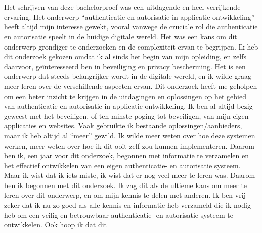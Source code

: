 
\chapter*{}%
\label{ch:voorwoord}


Het schrijven van deze bachelorproef was een uitdagende en heel verrijkende ervaring. Het onderwerp ``authenticatie en autorisatie in applicatie ontwikkeling'' heeft altijd mijn interesse gewekt, 
vooral vanwege de cruciale rol die authenticatie en autorisatie speelt in de huidige digitale wereld. Het was een kans om dit onderwerp grondiger te onderzoeken en de complexiteit ervan te begrijpen.
Ik heb dit onderzoek gekozen omdat ik al sinds het begin van mijn opleiding, en zelfs daarvoor, geïnteresseerd ben in beveiliging en privacy bescherming. Het is een onderwerp dat steeds belangrijker wordt 
in de digitale wereld, en ik wilde graag meer leren over de verschillende aspecten ervan. Dit onderzoek heeft me geholpen om een beter inzicht te krijgen in de uitdagingen en oplossingen op het gebied van
authenticatie en autorisatie in applicatie ontwikkeling.
\newline
Ik ben al altijd bezig geweest met het beveiligen, of ten minste poging tot beveiligen, van mijn eigen applicaties en websites. Vaak gebruikte ik bestaande oplossingen/aanbieders, maar ik heb altijd al ``meer'' gewild.
Ik wilde meer weten over hoe deze systemen werken, meer weten over hoe ik dit ooit zelf zou kunnen implementeren. Daarom ben ik, een jaar voor dit onderzoek, begonnen met informatie te verzamelen en
het effectief ontwikkelen van een eigen authenticatie- en autorisatie systeem. Maar ik wist dat ik iets miste, ik wist dat er nog veel meer te leren was.
\newline
Daarom ben ik begonnen met dit onderzoek. Ik zag dit als de ultieme kans om meer te leren over dit onderwerp, en om mijn kennis te delen met anderen.
Ik ben vrij zeker dat ik nu zo goed als alle kennis en informatie heb verzameld die ik nodig heb om een veilig en betrouwbaar authenticatie- en autorisatie systeem te ontwikkelen. Ook hoop ik dat dit
